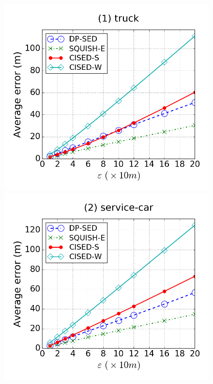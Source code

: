 \begin{figure}[tb]
\centering
\includegraphics[scale = 0.250]{figures/Exp-error-epsilon-truck.png}
\includegraphics[scale = 0.250]{figures/Exp-error-epsilon-service.png}

\end{figure}
